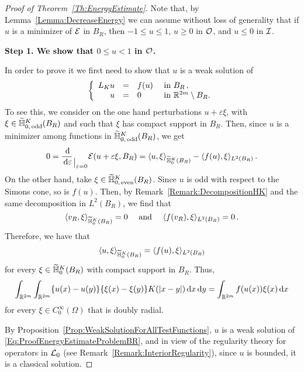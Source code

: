 \begin{proof}[Proof of Theorem~\ref{Th:EnergyEstimate}]

Note that, by Lemma~\ref{Lemma:DecreaseEnergy}  we can assume without loss of generality that if $u$ is a minimizer of $\mathcal{E}$ in $B_R$, then $-1 \leq u \leq 1$, $u \geq 0$ in $\mathcal{O}$, and $u \leq 0$ in $\mathcal{I}$. 

\textbf{Step 1. We show that $0\leq u < 1$ in $\mathcal{O}$.} 

In order to prove it we first need to show that $u$ is a weak solution of
\begin{equation}
\label{Eq:ProofEnergyEstimateProblemBR}
	\left\{\begin{array}{rcll}
	L_K  u &=& f(u) & \textrm{ in } B_R\,,\\
	u &=& 0 & \textrm{ in }\mathbb{R}^{2m} \setminus B_R.
	\end{array} \right.
\end{equation}
To see this, we consider on the one hand perturbations $u +  \varepsilon \xi$, with $\xi \in \widetilde{\mathbb{H}}^K_{0, \,\mathrm{odd}}(B_R)$ and such that $\xi$ has compact support in $B_R$. Then, since $u$ is a minimizer among functions in $\widetilde{\mathbb{H}}^K_{0, \,\mathrm{odd}}(B_R)$, we get
$$
0 = \dfrac{\,\mathrm{d}}{\,\mathrm{d} \varepsilon}_{\mkern1.5mu\big\vert_{\scriptstyle \varepsilon = 0}} \mathcal{E}(u +  \varepsilon \xi, B_R) = \langle u,\xi \rangle_{\widetilde{\mathbb{H}}^K_0(B_R)} - \langle f(u),\xi \rangle_{L^2(B_R)}\,.
$$
On the other hand, take $\xi \in \widetilde{\mathbb{H}}^K_{0, \,\mathrm{even}}(B_R)$. Since $u$ is odd with respect to the Simons cone, so is $f(u)$. Then, by Remark~\ref{Remark:DecompositionHK} and the same decomposition in $L^2(B_R)$, we find that
$$
\langle v_R,\xi \rangle_{\widetilde{\mathbb{H}}^K_0(B_R)} = 0 \quad \textrm{ and } \quad  \langle f(v_R),\xi \rangle_{L^2(B_R)} = 0\,.
$$
Therefore, we have that
$$
\langle u,\xi \rangle_{\widetilde{\mathbb{H}}^K_0(B_R)} = \langle f(u),\xi \rangle_{L^2(B_R)}
$$
for every $\xi \in\widetilde{\mathbb{H}}^K_0(B_R)$ with compact support in  $B_R$. Thus,
$$
\int_{\mathbb{R}^{2m}}\int_{\mathbb{R}^{2m}} \{u(x)-u(y)\}\{\xi(x)-\xi(y)\} K(|x-y|) \,\mathrm{d} x \,\mathrm{d} y = \int_{\mathbb{R}^{2m}} f(u(x)) \xi(x) \,\mathrm{d} x
$$
for every $\xi \in C^\infty_0(\Omega)$ that is doubly radial. 

By Proposition~\ref{Prop:WeakSolutionForAllTestFunctions}, $u$ is a weak solution of \eqref{Eq:ProofEnergyEstimateProblemBR}, and in view of the regularity theory for operators in $\mathcal{L}_0$ (see Remark~\ref{Remark:InteriorRegularity}), since $u$ is bounded, it is a classical solution.


\end{proof}
